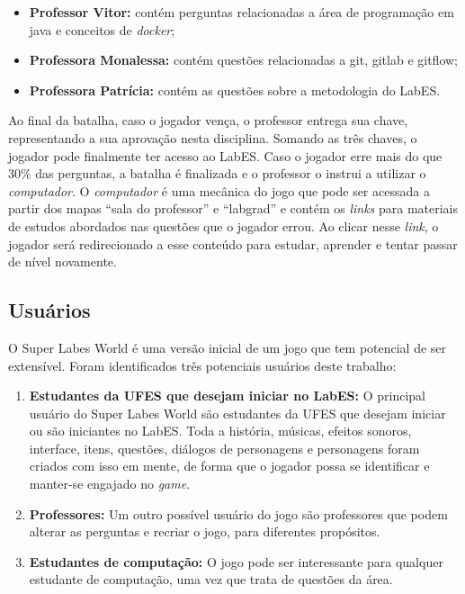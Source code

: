 \begin{itemize}
    \item \textbf{Professor Vitor: }contém perguntas relacionadas a área de programação em java e conceitos de \textit{docker};
    \item \textbf{Professora Monalessa: }contém questões relacionadas a git, gitlab e gitflow;
    \item \textbf{Professora Patrícia: } contém as questões sobre a metodologia do LabES.
\end{itemize}

Ao final da batalha, caso o jogador vença, o professor entrega sua chave, representando a sua aprovação nesta disciplina. Somando as três chaves, o jogador pode finalmente ter acesso ao LabES. Caso o jogador erre mais do que 30\% das perguntas, a batalha é finalizada e o professor o instrui a utilizar o \textit{computador}. O \textit{computador} é uma mecânica do jogo que pode ser acessada a partir dos mapas ``sala do professor'' e ``labgrad'' e contém os \textit{links} para materiais de estudos abordados nas questões que o jogador errou. Ao clicar nesse \textit{link}, o jogador será redirecionado a esse conteúdo para estudar, aprender e tentar passar de nível novamente.

\subsection{Usuários}
\label{sec:usuarios}
O Super Labes World é uma versão inicial de um jogo que tem potencial de ser extensível. Foram identificados três potenciais usuários deste trabalho:

\begin{enumerate}
    \item \textbf{Estudantes da UFES que desejam iniciar no LabES:} O principal usuário do Super Labes World são estudantes da UFES que desejam iniciar ou são iniciantes no LabES. Toda a história, músicas, efeitos sonoros, interface, itens, questões, diálogos de personagens e personagens foram criados com isso em mente, de forma que o jogador possa se identificar e manter-se engajado no \textit{game}. 
    \item \textbf{Professores:} Um outro possível usuário do jogo são professores que podem alterar as perguntas e recriar o jogo, para diferentes propósitos. 
    \item \textbf{Estudantes de computação:} O jogo pode ser interessante para qualquer estudante de computação, uma vez que trata de questões da área.
\end{enumerate}


